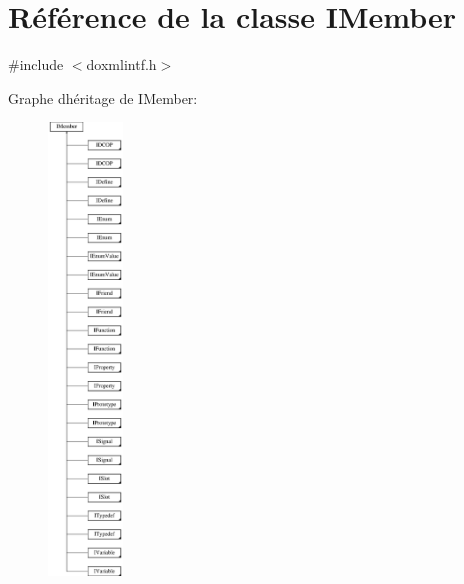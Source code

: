 \hypertarget{class_i_member}{}\section{Référence de la classe I\+Member}
\label{class_i_member}


{\ttfamily \#include $<$doxmlintf.\+h$>$}

Graphe d\textquotesingle{}héritage de I\+Member\+:\begin{figure}[H]
\begin{center}
\leavevmode
\includegraphics[height=12.000000cm]{class_i_member}
\end{center}
\end{figure}
